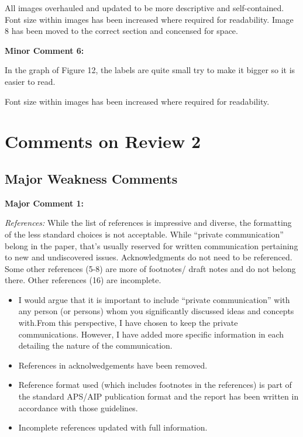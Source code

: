 \documentclass[%
 aip,
cp,  %
 amsmath,amssymb,
 reprint,%
]{revtex4-2}
\begin{document}
        {\color{red}
        
        All images overhauled and updated to be more descriptive and self-contained. Font size within images has been increased where required for readability. Image 8 has been moved to the correct section and concensed for space.

        }
        \begin{mdframed} \textbf{Minor Comment 6:}

            In the graph of Figure 12, the labels are quite small try to make it bigger so it is easier to read.
        \end{mdframed}
        {\color{red}
        
        Font size within images has been increased where required for readability.

        }
\newpage
\section{Comments on Review 2}

    \subsection{Major Weakness Comments}

        \begin{mdframed} \textbf{Major Comment 1:}
            
            \textit{References:} While the list of references is impressive and diverse, the formatting of the less standard choices is not acceptable. While ``private communication'' belong in the paper, that's usually reserved for written communication pertaining to new and undiscovered issues. Acknowledgments do not need to be referenced. Some other references (5-8) are more of footnotes/ draft notes and do not belong there. Other references (16) are incomplete.
        \end{mdframed}
        {\color{red}
        
            \begin{itemize}
                \item I would argue that it is important to include ``private communication'' with any person (or persons) whom you significantly discussed ideas and concepts with.From this perspective, I have chosen to keep the private communications. However, I have added more specific information in each detailing the nature of the communication.
                \item References in acknolwedgements have been removed.
                \item Reference format used (which includes footnotes in the references) is part of the standard APS/AIP publication format and the report has been written in accordance with those guidelines.
                \item Incomplete references updated with full information.
            \end{itemize}
        
        }
\end{document}
